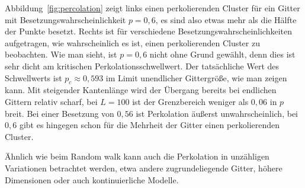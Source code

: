 Abbildung~\ref{fig:percolation} zeigt links einen perkolierenden
Cluster für ein Gitter mit Besetzungswahrscheinlichkeit $p=0,6$, es
sind also etwas mehr als die Hälfte der Punkte besetzt. Rechts ist für
verschiedene Besetzungswahrscheinlichkeiten aufgetragen, wie
wahrscheinlich es ist, einen perkolierenden Cluster zu beobachten. Wie
man sieht, ist $p=0,6$ nicht ohne Grund gewählt, denn dies ist sehr
dicht am kritischen Perkolationsschwellwert. Der tatsächliche Wert des
Schwellwerts ist $p_c\approx 0,593$ im Limit unendlicher Gittergröße,
wie man zeigen kann. Mit steigender Kantenlänge wird der Übergang
bereits bei endlichen Gittern relativ scharf, bei $L=100$ ist der
Grenzbereich weniger als $0,06$ in $p$ breit. Bei einer Besetzung von
$0,56$ ist Perkolation äußerst unwahrscheinlich, bei $0,6$ gibt es
hingegen schon für die Mehrheit der Gitter einen perkolierenden
Cluster.

Ähnlich wie beim Random walk kann auch die Perkolation in unzähligen
Variationen betrachtet werden, etwa andere zugrundeliegende Gitter,
höhere Dimensionen oder auch kontinuierliche Modelle.

\afterpage{
\raggedbottom 
}
